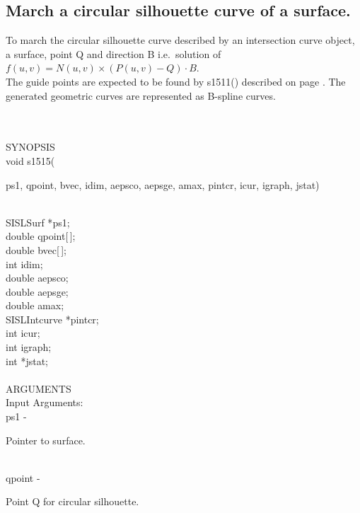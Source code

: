 \subsection{March a circular silhouette curve of a surface.}
\begin{minipg1}
  To march the circular silhouette curve described by an intersection
  curve object, a surface, point Q and direction B
  i.e.\ solution of  $f(u,v)=N(u,v)\times (P(u,v)-Q)\cdot B$.\\
  The guide points are expected to be found by s1511() described on
  page \pageref{s1511}.
  The generated geometric curves are represented as B-spline curves.
\end{minipg1}\\ \\
SYNOPSIS\\
        \>void s1515(\begin{minipg3}
          {\fov ps1},  {\fov qpoint},  {\fov bvec},  {\fov idim},  {\fov aepsco},  {\fov aepsge},  {\fov amax},  {\fov pintcr},  {\fov icur},  {\fov igraph},  {\fov jstat})
        \end{minipg3}\\[0.3ex]
        \>\>    SISLSurf \> *{\fov ps1};\\
        \>\>    double   \> {\fov qpoint}[\,];\\
        \>\>    double   \> {\fov bvec}[\,];\\
        \>\>    int      \> {\fov idim};\\
        \>\>    double   \> {\fov aepsco};\\
        \>\>    double   \> {\fov aepsge};\\
        \>\>    double   \> {\fov amax};\\
        \>\>    SISLIntcurve \> *{\fov pintcr};\\
        \>\>    int      \> {\fov icur};\\
        \>\>    int      \> {\fov igraph};\\
        \>\>    int      \> *{\fov jstat};\\
\\
ARGUMENTS\\
        \>Input Arguments:\\
        \>\>    {\fov ps1}\> - \>  \begin{minipg2}
                     Pointer to surface.
                               \end{minipg2}\\
        \>\>    {\fov qpoint}\> - \>  \begin{minipg2}
                     Point Q for circular silhouette.
                               \end{minipg2}\\
